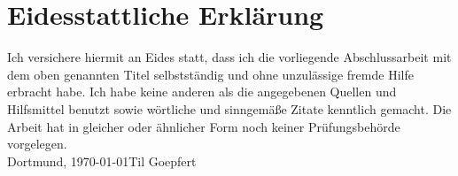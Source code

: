 \newpage
\thispagestyle{empty}
\section*{Eidesstattliche Erklärung}
\thispagestyle{empty}
Ich versichere hiermit an Eides statt, dass ich die vorliegende Abschlussarbeit mit dem oben genannten Titel selbstständig und ohne unzulässige fremde Hilfe erbracht habe. Ich habe keine anderen als die angegebenen Quellen und Hilfsmittel benutzt sowie wörtliche und sinngemäße Zitate kenntlich gemacht. Die Arbeit hat in gleicher oder ähnlicher Form noch keiner Prüfungsbehörde vorgelegen.
\vspace{4\baselineskip}\\
Dortmund, \today \hfill Til Goepfert
\vspace{4\baselineskip}\\
